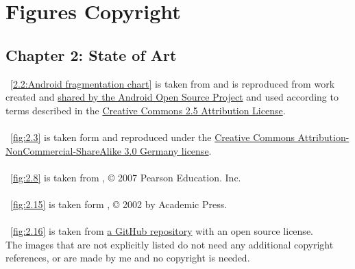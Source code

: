 %
%
\chapter{Figures Copyright}
%
\label{cap:figurescopyright}
%
%
\section*{Chapter 2: State of Art}
\bigskip
\figurename~\ref{2.2:Android fragmentation chart} is taken from \cite{devandroiddash} and is reproduced from work created and \href{http://code.google.com/policies.html}{shared by the Android Open Source Project} and used according to terms described in the \href{http://creativecommons.org/licenses/by/2.5/}{Creative Commons 2.5 Attribution License}.\\\\
\figurename~\ref{fig:2.3} is taken form \cite{vogel2016android} and reproduced under the \href{http://creativecommons.org/licenses/by-nc-sa/3.0/de/deed.en}{Creative Commons Attribution-NonCommercial-ShareAlike 3.0 Germany license}.\\\\
\figurename~\ref{fig:2.8} is taken from \cite{tanenbaum2010distributed}, © 2007 Pearson Education. Inc.\\\\
\figurename~\ref{fig:2.15} is taken form \cite{calvert2011tcp}, © 2002 by Academic Press.\\\\
\figurename~\ref{fig:2.16} is taken from \href{https://github.com/harry1357931/Remote\_Method\_Invocation-RMI}{a GitHub repository} with an open source license.\\

%
\bigskip
The images that are not explicitly listed do not need any additional copyright references, or are made by me and no copyright is needed.
 
